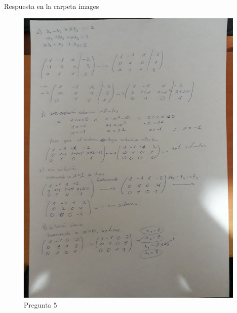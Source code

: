 \documentclass[
  letterpaper,
  DIV=11,
  numbers=noendperiod]{scrartcl}
\begin{document}
Respuesta en la carpeta images

\begin{figure}[H]

{\centering \includegraphics{images/image1.jpeg}

}

\caption{Pregunta 5}

\end{figure}%
\end{document}
